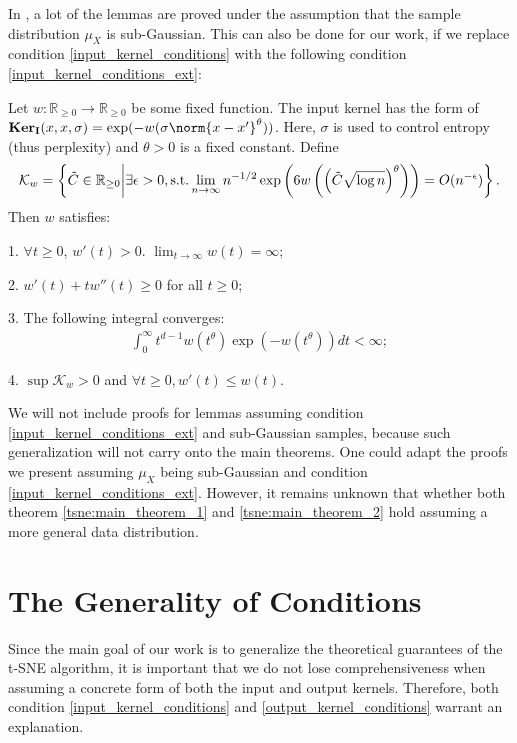 \begin{remark}
    In \cite{auffinger-tsne}, a lot of the lemmas are proved under the assumption that the sample distribution $\mu_X$ is sub-Gaussian. This can also be done for our work, if we replace condition \ref{input_kernel_conditions} with the following condition \ref{input_kernel_conditions_ext}:
    \begin{condition} \label{input_kernel_conditions_ext}
        Let $w: \mathbb{R}_{\geq 0} \to \mathbb{R}_{\geq 0}$ be some fixed function. The input kernel has the form of $\ki(x,x,\sigma) = \exp(-w(\sigma\norm{x-x'}^{\theta}))$. Here, $\sigma$ is used to control entropy (thus perplexity) and $\theta>0$ is a fixed constant. Define
        \begin{align} \label{tsne:kw_def}
            \mathcal{K}_w = \left\{\tilde{C} \in \mathbb{R}_{\geq 0} \bigg\rvert \exists \epsilon>0, \text{\normalfont s.t.} \lim_{n \to \infty} n^{-1/2} \exp \left(6 w\left(\left(\tilde{C} \sqrt{\log n} \right)^{\theta} \right) \right) = O(n^{-\epsilon}) \right\}.
        \end{align}
        Then $w$ satisfies:

        1. $\forall t \geq 0$, $w'(t)>0$. $\lim_{t \to \infty} w(t) = \infty$;

        2. $w'(t)+tw''(t) \geq 0$ for all $t \geq 0$;

        3. The following integral converges:
        \begin{align}
            \int_0^{\infty} t^{d-1} w(t^{\theta}) \exp(-w(t^{\theta}))dt < \infty;
        \end{align}

        4. $\sup \mathcal{K}_w > 0$ and $\forall t \geq 0, w'(t) \leq w(t)$.
    \end{condition}
    We will not include proofs for lemmas assuming condition \ref{input_kernel_conditions_ext} and sub-Gaussian samples, because such generalization will not carry onto the main theorems. One could adapt the proofs we present assuming $\mu_X$ being sub-Gaussian and condition \ref{input_kernel_conditions_ext}. However, it remains unknown that whether both theorem \ref{tsne:main_theorem_1} and \ref{tsne:main_theorem_2} hold assuming a more general data distribution.
\end{remark}
\section{The Generality of Conditions} \label{tsne:sec:generality_conditions}
Since the main goal of our work is to generalize the theoretical guarantees of
the t-SNE algorithm, it is important that we do not lose comprehensiveness when
assuming a concrete form of both the input and output kernels. Therefore, both
condition \ref{input_kernel_conditions} and \ref{output_kernel_conditions}
warrant an explanation.

